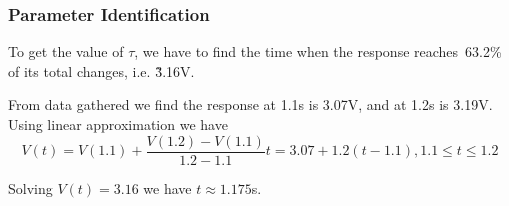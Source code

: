 \subsubsection*{Parameter Identification}
To get the value of $\tau$, we have to find the time when the response reaches\
63.2\% of its total changes, i.e. \~3.16V.

From data gathered we find the response at 1.1s is 3.07V, and at 1.2s is 3.19V.
Using linear approximation we have 
\[V(t) = V(1.1) + \frac{V(1.2)-V(1.1)}{1.2-1.1}t = 3.07+1.2(t-1.1),
                                                          1.1\leq t \leq 1.2\]

Solving $V(t)=3.16$ we have $t\approx 1.175$s.

